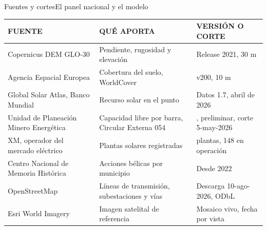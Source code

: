 \documentclass[aspectratio=169, 11pt]{beamer}
\renewcommand{\arraystretch}{1.25}
\begin{document}
\begin{frame}{Fuentes y cortes}{El panel nacional y el modelo}
  {\scriptsize\renewcommand{\arraystretch}{1.14}\setlength{\tabcolsep}{4pt}
  \begin{tabular}{@{}>{\raggedright\arraybackslash}p{4.55cm} >{\raggedright\arraybackslash}p{4.95cm} >{\raggedright\arraybackslash}p{3.90cm}@{}}
    \toprule
    \textcolor{tinta3}{FUENTE} & \textcolor{tinta3}{QUÉ APORTA} & \textcolor{tinta3}{VERSIÓN O CORTE}\\
    \midrule
    Copernicus DEM GLO-30 & Pendiente, rugosidad y elevación & Release 2021, 30 m\\
    Agencia Espacial Europea & Cobertura del suelo, WorldCover & 2021 v200, 10 m\\
    Global Solar Atlas, Banco Mundial & Recurso solar en el punto & Datos 1.7, abril de 2026\\
    Unidad de Planeación Minero Energética & Capacidad libre por barra, Circular Externa 054 & 2026, preliminar, corte 5-may-2026\\
    XM, operador del mercado eléctrico & Plantas solares registradas & 253 plantas, 148 en operación\\
    Centro Nacional de Memoria Histórica & Acciones bélicas por municipio & Desde 2022\\
    OpenStreetMap & Líneas de transmisión, subestaciones y vías & Descarga 10-ago-2026, ODbL\\
    Esri World Imagery & Imagen satelital de referencia & Mosaico vivo, fecha por vista\\
    \bottomrule
  \end{tabular}}
\end{frame}
\end{document}
